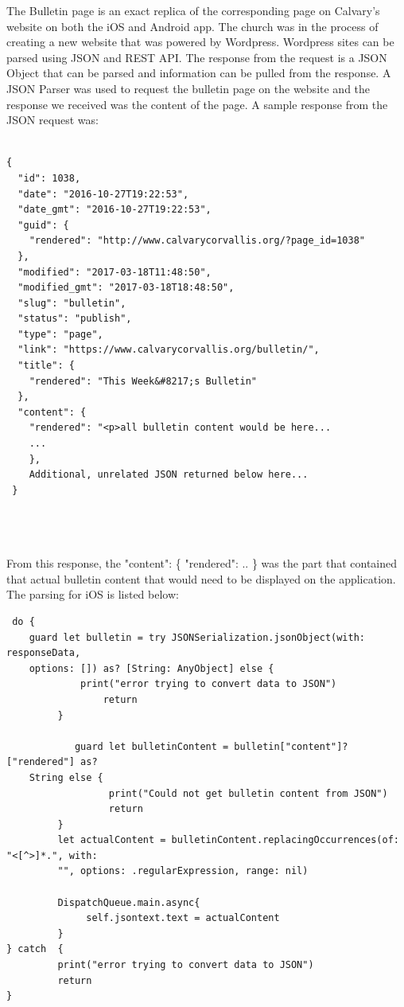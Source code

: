 \documentclass[letterpaper,10pt,draftclsnofoot,onecolumn,titlepage]{IEEEtran}
\begin{document}
		The Bulletin page is an exact replica of the corresponding page on Calvary's website on both the iOS and Android app. 
		The church was in the process of creating a new website that was powered by Wordpress. 
		Wordpress sites can be parsed using JSON and REST API. 
		The response from the request is a JSON Object that can be parsed and information can be pulled from the response.
		A JSON Parser was used to request the bulletin page on the website and the response we received was the content of the page. 
		A sample response from the JSON request was: 
		
		\begin{lstlisting}
		
{
  "id": 1038,
  "date": "2016-10-27T19:22:53",
  "date_gmt": "2016-10-27T19:22:53",
  "guid": {
    "rendered": "http://www.calvarycorvallis.org/?page_id=1038"
  },
  "modified": "2017-03-18T11:48:50",
  "modified_gmt": "2017-03-18T18:48:50",
  "slug": "bulletin",
  "status": "publish",
  "type": "page",
  "link": "https://www.calvarycorvallis.org/bulletin/",
  "title": {
    "rendered": "This Week&#8217;s Bulletin"
  },
  "content": {
    "rendered": "<p>all bulletin content would be here...
    ...
    },
    Additional, unrelated JSON returned below here...
 }
    
		
		
		\end{lstlisting}

		From this response, the "content": \{ "rendered": .. \} was the part that contained that actual bulletin content that would need to be displayed on the application. 
		The parsing for iOS is listed below: 
		
		\begin{lstlisting}
 do {
 	guard let bulletin = try JSONSerialization.jsonObject(with: responseData, 
	options: []) as? [String: AnyObject] else {			
	         print("error trying to convert data to JSON")
                 return
         }
                
        	guard let bulletinContent = bulletin["content"]?["rendered"] as? 
	String else {
                  print("Could not get bulletin content from JSON")
                  return
         }
         let actualContent = bulletinContent.replacingOccurrences(of: "<[^>]*.", with: 
         "", options: .regularExpression, range: nil)
             
         DispatchQueue.main.async{		            
 	          self.jsontext.text = actualContent
         }		                   
} catch  {
         print("error trying to convert data to JSON")
         return
}
\end{lstlisting}
\end{document}
